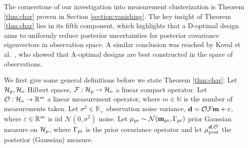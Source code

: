 \begin{enumerate}




\end{enumerate}

The cornerstone of our investigation into measurement clusterization
is Theorem \ref{thm:char} proven in Section
\ref{section:vanishing}. The key insight of Theorem \ref{thm:char}
lies in its fifth component, which highlights that a D-optimal design
aims to uniformly reduce posterior uncertainties for posterior
covariance eigenvectors in observation space. A similar conclusion was
reached by Koval et al.~\cite{koval2020}, who showed that A-optimal
designs are best constructed in the space of observations.

We first give some general definitions before we state Theorem
\ref{thm:char}: Let \(\mathcal{H}_p, \mathcal{H}_o\) Hilbert spaces, \(\mathcal{F}:\mathcal{H}_p \to
\mathcal{H}_o\) a linear compact operator. Let \(\mathcal{O}: \mathcal{H}_o \to \mathbb{R}^m\) a
linear measurement operator, where \(m \in \mathbb{N}\) is the number of
measurements taken. Let \(\sigma^2 \in \mathbb{R}_{+}\) observation
noise variance, \(\mathbf{d} = \mathcal{O} \mathcal{F} \mathbf{m} + \varepsilon\), where \(\varepsilon \in
\mathbb{R}^m\) is iid \(\mathcal{N}(0, \sigma^2)\) noise. Let \(\mu_{\textup{pr}} \sim
\mathcal{N}(\mathbf{m}_{\textup{pr}}, \Gamma_{\textup{pr}})\) prior Gaussian measure on \(\mathcal{H}_p\), where
\(\Gamma_{\textup{pr}}\) is the prior covariance operator and let \(\mu_{\textup{post}}^{\mathbf{d}, \mathcal{O}}\) the
posterior (Gaussian) measure.
  
